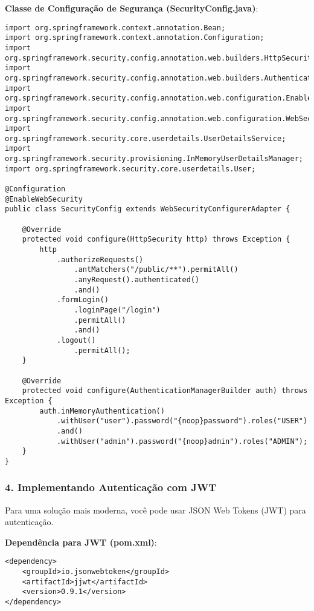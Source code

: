 \documentclass[a4paper,12pt]{book}
\begin{document}
\textbf{Classe de Configuração de Segurança (SecurityConfig.java)}:
\begin{verbatim}
import org.springframework.context.annotation.Bean;
import org.springframework.context.annotation.Configuration;
import org.springframework.security.config.annotation.web.builders.HttpSecurity;
import org.springframework.security.config.annotation.web.builders.AuthenticationManagerBuilder;
import org.springframework.security.config.annotation.web.configuration.EnableWebSecurity;
import org.springframework.security.config.annotation.web.configuration.WebSecurityConfigurerAdapter;
import org.springframework.security.core.userdetails.UserDetailsService;
import org.springframework.security.provisioning.InMemoryUserDetailsManager;
import org.springframework.security.core.userdetails.User;

@Configuration
@EnableWebSecurity
public class SecurityConfig extends WebSecurityConfigurerAdapter {

    @Override
    protected void configure(HttpSecurity http) throws Exception {
        http
            .authorizeRequests()
                .antMatchers("/public/**").permitAll()
                .anyRequest().authenticated()
                .and()
            .formLogin()
                .loginPage("/login")
                .permitAll()
                .and()
            .logout()
                .permitAll();
    }

    @Override
    protected void configure(AuthenticationManagerBuilder auth) throws Exception {
        auth.inMemoryAuthentication()
            .withUser("user").password("{noop}password").roles("USER")
            .and()
            .withUser("admin").password("{noop}admin").roles("ADMIN");
    }
}
\end{verbatim}

\subsubsection{4. Implementando Autenticação com JWT}
Para uma solução mais moderna, você pode usar JSON Web Tokens (JWT) para autenticação.

\textbf{Dependência para JWT (pom.xml)}:
\begin{verbatim}
<dependency>
    <groupId>io.jsonwebtoken</groupId>
    <artifactId>jjwt</artifactId>
    <version>0.9.1</version>
</dependency>
\end{verbatim}
\end{document}
